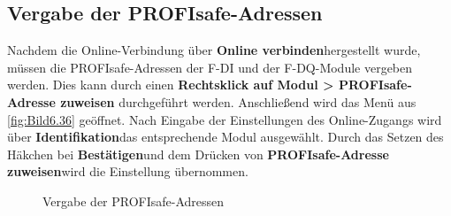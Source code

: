 \clearpage

\subsection{Vergabe der PROFIsafe-Adressen} \label{sec: vergabe der profisafe-adressen}

Nachdem die Online-Verbindung über \glqq\textbf{Online verbinden}\grqq\:hergestellt wurde, müssen die PROFIsafe-Adressen der F-DI und der F-DQ-Module vergeben werden. Dies kann durch einen \textbf{Rechtsklick auf Modul > PROFIsafe-Adresse zuweisen} durchgeführt werden. Anschließend wird das Menü aus \autoref{fig:Bild6.36} geöffnet. Nach Eingabe der Einstellungen des Online-Zugangs wird über \glqq\textbf{Identifikation}\grqq\:das entsprechende Modul ausgewählt. Durch das Setzen des Häkchen bei \glqq\textbf{Bestätigen}\grqq\:und dem Drücken von \glqq\textbf{PROFIsafe-Adresse zuweisen}\grqq\:wird die Einstellung übernommen.

\begin{figure}[H]
   \centering
   \caption[Vergabe der PROFIsafe-Adressen]{Vergabe der PROFIsafe-Adressen}
   \label{fig:Bild6.36}
\end{figure}
